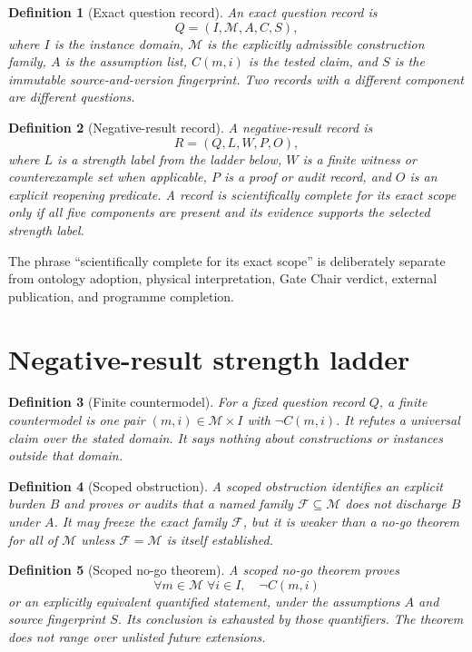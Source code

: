 \documentclass[11pt]{article}
\newtheorem{definition}{Definition}
\begin{document}
\begin{definition}[Exact question record]
An exact question record is
\[
 Q=(I,\mathcal{M},A,C,S),
\]
where $I$ is the instance domain, $\mathcal{M}$ is the explicitly admissible
construction family, $A$ is the assumption list, $C(m,i)$ is the tested claim,
and $S$ is the immutable source-and-version fingerprint.  Two records with a
different component are different questions.
\end{definition}

\begin{definition}[Negative-result record]
A negative-result record is
\[
 R=(Q,L,W,P,O),
\]
where $L$ is a strength label from the ladder below, $W$ is a finite witness or
counterexample set when applicable, $P$ is a proof or audit record, and $O$ is
an explicit reopening predicate.  A record is \emph{scientifically complete
for its exact scope} only if all five components are present and its evidence
supports the selected strength label.
\end{definition}

The phrase ``scientifically complete for its exact scope'' is deliberately
separate from ontology adoption, physical interpretation, Gate Chair verdict,
external publication, and programme completion.

\section{Negative-result strength ladder}

\begin{definition}[Finite countermodel]
For a fixed question record $Q$, a finite countermodel is one pair
$(m,i)\in\mathcal{M}\times I$ with $\neg C(m,i)$.  It refutes a universal
claim over the stated domain.  It says nothing about constructions or
instances outside that domain.
\end{definition}

\begin{definition}[Scoped obstruction]
A scoped obstruction identifies an explicit burden $B$ and proves or audits
that a named family $\mathcal{F}\subseteq\mathcal{M}$ does not discharge $B$
under $A$.  It may freeze the exact family $\mathcal{F}$, but it is weaker than
a no-go theorem for all of $\mathcal{M}$ unless $\mathcal{F}=\mathcal{M}$ is
itself established.
\end{definition}

\begin{definition}[Scoped no-go theorem]
A scoped no-go theorem proves
\[
  \forall m\in\mathcal{M}\;\forall i\in I,\quad \neg C(m,i)
\]
or an explicitly equivalent quantified statement, under the assumptions $A$
and source fingerprint $S$.  Its conclusion is exhausted by those
quantifiers.  The theorem does not range over unlisted future extensions.
\end{definition}
\end{document}
